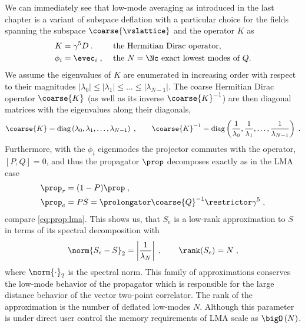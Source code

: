 We can immediately see that low-mode averaging as introduced in the last chapter is a variant of subspace deflation with a particular choice for the fields spanning the subspace $\coarse{\vslattice}$ and the operator $K$ as
\begin{align}
K &= \gamma^{5} D \:.  &  &\text{ the Hermitian Dirac operator,} \\
\phi_i &= \evec_i \;,  &  &\text{ the $N=\Nc$ exact lowest modes of $Q$.}
\end{align}
We assume the eigenvalues of $K$ are enumerated in increasing order with respect to their magnitudes $\lvert \lambda_0 \rvert \leq \lvert \lambda_1 \rvert \leq \ldots \leq \lvert \lambda_{N-1} \rvert$.
The coarse Hermitian Dirac operator $\coarse{K}$ (as well as its inverse $\coarse{K}^{-1}$) are then diagonal matrices with the eigenvalues along their diagonals,
\begin{equation} \label{eq:sd:lma:diagonal:dirac}
\coarse{K} = \text{diag}\left(\lambda_0, \lambda_1, \ldots, \lambda_{N-1}\right) \;,
\qquad
\coarse{K}^{-1} = \text{diag}\left(\frac{1}{\lambda_0}, \frac{1}{\lambda_1}, \ldots, \frac{1}{\lambda_{N-1}}\right) \;.
\end{equation}
Furthermore, with the $\phi_i$ eigenmodes the projector commutes with the operator, $[P,Q]=0$, and thus the propagator $\prop$ decomposes exactly as in the LMA case
\begin{align}
\prop_{r} &= (1-P) \prop \;, \\
\prop_{e} &= PS = \prolongator \coarse{Q}^{-1} \restrictor \gamma^5 \;,
\end{align}
compare \cref{eq:prop:lma}.
This shows us, that $S_e$ is a low-rank approximation to $S$ in terms of its spectral decomposition with
\begin{equation}
\norm{S_e - S}_2
 = \left\lvert \frac{1}{\lambda_{N}} \right\rvert \;,
\qquad
\rank(S_e) = N \;,
\end{equation}
where $\norm{\cdot}_2$ is the spectral norm.
This family of approximations conserves the low-mode behavior of the propagator which is responsible for the large distance behavior of the vector two-point correlator.
The rank of the approximation is the number of deflated low-modes $N$.
Although this parameter is under direct user control the memory requirements of LMA scale as $\bigO\left( N \right)$.

